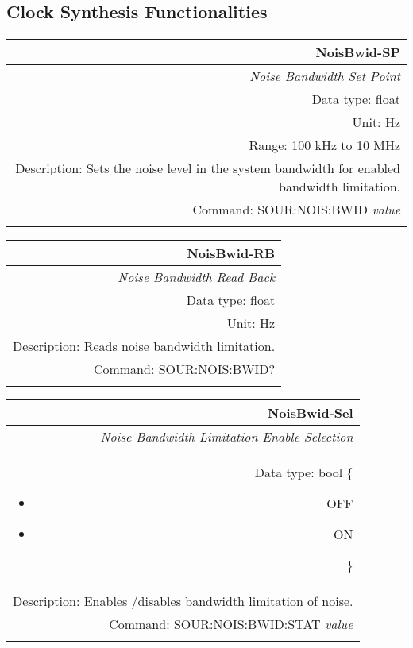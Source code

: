 \documentclass[openany]{article}
\begin{document}
	\subsection{Clock Synthesis Functionalities}\label{pvgroup:function} %

		\paragraph{} %

		\begin{tabular}{N}
			\hline
			\bfseries NoisBwid-SP \\ \hline
			\emph{Noise Bandwidth Set Point} \\
			Data type: float \\
			Unit: Hz \\
			Range: 100 kHz to 10 MHz \\
			Description: Sets the noise level in the system bandwidth for enabled bandwidth limitation. \\
			Command: SOUR:NOIS:BWID \emph{value} \\
			\\

		\end{tabular}


		\begin{tabular}{N}
			\hline
			\bfseries NoisBwid-RB \\ \hline
			\emph{Noise Bandwidth Read Back} \\
			Data type: float \\
			Unit: Hz \\
			Description: Reads noise bandwidth limitation. \\
			Command: SOUR:NOIS:BWID? \\
			\\

		\end{tabular}


		\begin{tabular}{N}
			\hline
			\bfseries NoisBwid-Sel \\ \hline
			\emph{Noise Bandwidth Limitation Enable Selection} \\
			Data type: bool \{\begin{itemize}[noitemsep]
				\small
				\item[] OFF
				\item[] ON
			\end{itemize}\} \\
			Description: Enables /disables bandwidth limitation of noise. \\
			Command: SOUR:NOIS:BWID:STAT \emph{value} \\
			\\

		\end{tabular}
\end{document}
